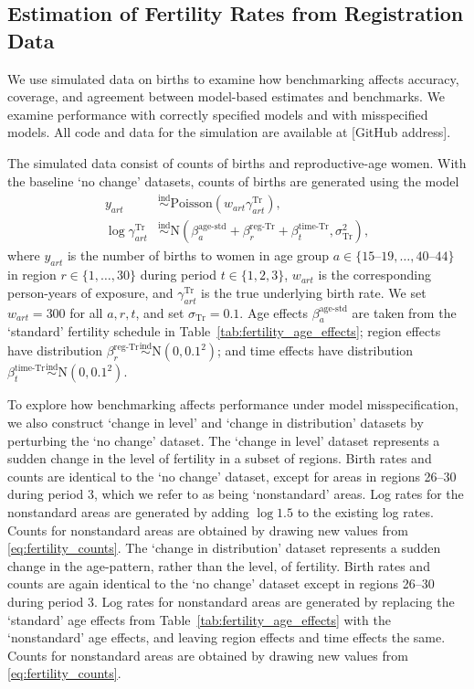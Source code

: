 \documentclass[12pt]{article}
\newcommand{\ind}{\stackrel{\text{ind}}{\sim}}
\begin{document}
\subsection{Estimation of Fertility Rates from Registration Data}
  \label{sec:fertility}

We use simulated data on births to examine how benchmarking affects accuracy, coverage, and agreement between model-based estimates and benchmarks.  We examine performance with correctly specified models and with misspecified models.  All code and data for the simulation are available at [GitHub address].

The simulated data consist of counts of births and reproductive-age women.  With the baseline `no change' datasets, counts of births are generated using the model
\begin{align}
  y_{art}  & \ind \text{Poisson}( w_{art} \gamma_{art}^{\text{Tr}} ), \label{eq:fertility_counts} \\
  \log \gamma_{art}^{\text{Tr}}  & \ind \text{N}\left( \beta_a^{\text{age-std}} + \beta_r^{\text{reg-Tr}} + \beta_t^{\text{time-Tr}}, \sigma_{\text{Tr}}^2 \right), \label{eq:fertility_log_rates}
\end{align}
where $y_{art}$ is the number of births to women in age group $a \in\{ 15\text{--}19, \dots, 40\text{--}44\}$ in region $r \in\{ 1, \dots, 30\}$ during period $t \in\{1,2,3\}$, $w_{art}$ is the corresponding person-years of exposure, and $\gamma_{art}^{\text{Tr}}$ is the true underlying birth rate.  We set $w_{art} = 300$ for all $a,r,t$, and set $\sigma_{\text{Tr}} = 0.1$.  Age effects $\beta_a^{\text{age-std}}$ are taken from the `standard' fertility schedule in Table~\ref{tab:fertility_age_effects}; region effects have distribution $\beta_r^{\text{reg-Tr} } \ind \text{N}(0, 0.1^2)$; and time effects have distribution $\beta_t^{\text{time-Tr}} \ind \text{N}(0, 0.1^2)$.



To explore how benchmarking affects performance under model misspecification, we also construct `change in level' and `change in distribution' datasets by perturbing the `no change' dataset.  The `change in level' dataset represents a sudden change in the level of fertility in a subset of regions.  Birth rates and counts are identical to the `no change' dataset, except for areas in regions 26--30 during period 3, which we refer to as being `nonstandard' areas.  Log rates for the nonstandard areas are generated by adding $\log1.5$ to the existing log rates.  Counts for nonstandard areas are obtained by drawing new values from \eqref{eq:fertility_counts}.  The `change in distribution' dataset represents a sudden change in the age-pattern, rather than the level, of fertility.  Birth rates and counts are again identical to the `no change' dataset except in regions 26--30 during period 3. Log rates for nonstandard areas are generated by replacing the `standard' age effects from Table~\ref{tab:fertility_age_effects} with the `nonstandard' age effects, and leaving region effects and time effects the same.  Counts for nonstandard areas are obtained by drawing new values from \eqref{eq:fertility_counts}.
\end{document}
